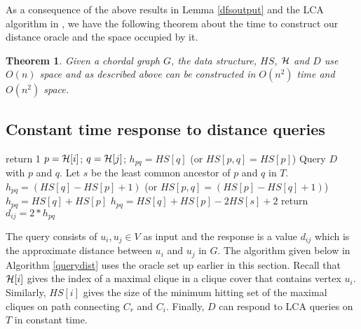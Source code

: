 \documentclass[MS,synopsis]{iitmdiss}
\newtheorem{theorem}{Theorem}
\begin{document}
 \noindent
 As a consequence of the above results in Lemma \ref{dfsoutput} and the LCA algorithm in \cite{lcabyvishkin}, 
 we have the following theorem about the time to construct our distance oracle and the space occupied by it.
 \begin{theorem} \label{oracle}
 Given a chordal graph $G$, the data structure, $HS$, ${\cal H}$ and $D$ use $O(n)$ 
 space and as described above can be constructed in $O(n^2)$ time and $O(n^2)$ space.  
 \end{theorem}
 
 \subsection{Constant time response to distance queries}
 \begin{algorithm}[h] 
  \caption{$Query(u_i,u_j)$- uses the Oracle ${\cal H}, HS, D$ as in Theorem \ref{oracle}}
  \label{querydist}
  \begin{algorithmic}[1]
    	\STATE return 1
  \ENDIF
  \STATE $p = {\cal H}[i]$; 
  \STATE $q = {\cal H}[j]$;
  	\STATE $h_{pq}=HS[q]$ (or $HS[p,q]=HS[p]$)
	\ELSE
	\STATE Query $D$ with $p$ and $q$.
	\STATE Let $s$ be the least common ancestor of $p$ and $q$ in $T$.
  	\STATE $h_{pq}=(HS[q]-HS[p]+1)$ (or $HS[p,q]=(HS[p]-HS[q]+1)$)
	\ELSE
  	\STATE $h_{pq}=HS[q]+HS[p]$ 
	\ELSE
	\STATE  $h_{pq}=HS[q]+HS[p]-2HS[s]+2$
	\ENDIF
	\ENDIF
	\ENDIF
	\STATE return $d_{ij} = 2*h_{pq}$
    \end{algorithmic}
 \end{algorithm}
 The query consists of $u_i,u_j \in V$ as input and the response is a value $d_{ij}$ which is the
 approximate distance between $u_i$ and $u_j$ in $G$. The algorithm given below in Algorithm \ref{querydist} 
 uses the oracle set up earlier in this section.  Recall that ${\cal H}[i]$ gives the index of a maximal clique
 in a clique cover that contains vertex $u_i$.  Similarly, $HS[i]$ gives the size of the minimum hitting set of 
 the  maximal cliques on path connecting $C_r$ and $C_i$.  Finally, $D$ can respond to LCA queries on $T$ in constant time.
  
\end{document}
